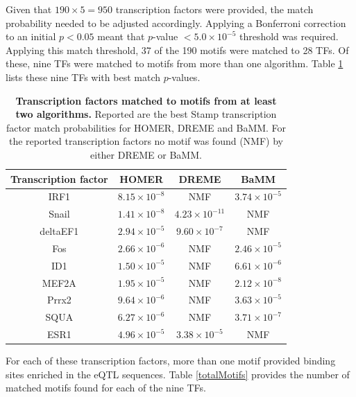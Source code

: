 \documentclass[12pt]{article}
\begin{document}
Given that $190 \times 5 = 950$ transcription factors were provided, the match probability needed to be adjusted accordingly. Applying a Bonferroni correction to an initial $p < 0.05$ meant that $p$-value $< 5.0\times10^{-5}$ threshold was required. Applying this match threshold, 37 of the 190 motifs were matched to 28 TFs. Of these, nine TFs were matched to motifs from more than one algorithm.
Table \ref{tfsWithMotifs} lists these nine TFs with best match $p$-values.

\begin{table}[!htbp]
\caption{{\bf Transcription factors matched to motifs from at least two algorithms.} Reported are the best Stamp transcription factor match probabilities for HOMER, DREME and BaMM. For the reported transcription factors no motif was found (NMF) by either DREME or BaMM.}
\label{tfsWithMotifs}
\centering
\begin{tabular}{cccc}
\toprule[0.2em]
Transcription factor & HOMER & DREME & BaMM\\
\midrule[0.1em]
IRF1             & $8.15\times10^{-8}$ & NMF & $3.74\times10^{-5}$\\
Snail             & $1.41\times10^{-8}$ & $4.23\times10^{-11}$ & NMF\\
deltaEF1      & $2.94\times10^{-5}$ & $9.60\times10^{-7}$ & NMF\\
Fos              & $2.66\times10^{-6}$ & NMF & $2.46\times10^{-5}$\\
ID1              & $1.50\times10^{-5}$ & NMF & $6.61\times10^{-6}$\\
MEF2A        & $1.95\times10^{-5}$ & NMF & $2.12\times10^{-8}$\\
Prrx2           & $9.64\times10^{-6}$ & NMF & $3.63\times10^{-5}$\\
SQUA         & $6.27\times10^{-6}$ & NMF  &$ 3.71\times10^{-7}$\\
ESR1         & $4.96\times10^{-5}$ & $3.38\times10^{-5}$ & NMF\\
\bottomrule[0.2em]
\end{tabular}
\end{table}

For each of these transcription factors, more than one motif provided binding sites enriched in the eQTL sequences. Table \ref{totalMotifs} provides the number of matched motifs found for each of the nine TFs.
\end{document}
